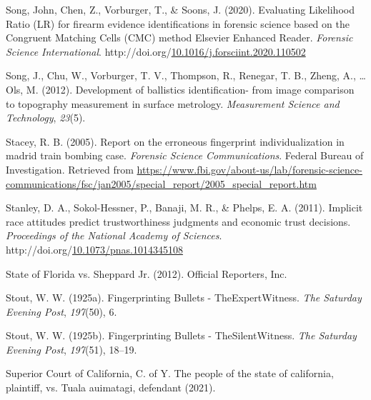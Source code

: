 \documentclass[print]{nuthesis}
\newlength{\cslhangindent}
\newenvironment{CSLReferences}[2]%
{\setlength{\parindent}{0pt}%
\everypar{\setlength{\hangindent}{\cslhangindent}}\ignorespaces}%
{\par}
\begin{document}
\begin{CSLReferences}{1}{0}
\leavevmode{}%
Song, John, Chen, Z., Vorburger, T., \& Soons, J. (2020). Evaluating {Likelihood} {Ratio} ({LR}) for firearm evidence identifications in forensic science based on the {Congruent} {Matching} {Cells} ({CMC}) method {\textbar} {Elsevier} {Enhanced} {Reader}. \emph{Forensic Science International}. http://doi.org/\href{https://doi.org/10.1016/j.forsciint.2020.110502}{10.1016/j.forsciint.2020.110502}

\leavevmode{}%
Song, J., Chu, W., Vorburger, T. V., Thompson, R., Renegar, T. B., Zheng, A., \ldots{} Ols, M. (2012). Development of ballistics identification- from image comparison to topography measurement in surface metrology. \emph{Measurement Science and Technology}, \emph{23}(5).

\leavevmode{}%
Stacey, R. B. (2005). Report on the erroneous fingerprint individualization in madrid train bombing case. \emph{Forensic Science Communications}. {Federal Bureau of Investigation}. Retrieved from \url{https://www.fbi.gov/about-us/lab/forensic-science-communications/fsc/jan2005/special_report/2005_special_report.htm}

\leavevmode{}%
Stanley, D. A., Sokol-Hessner, P., Banaji, M. R., \& Phelps, E. A. (2011). Implicit race attitudes predict trustworthiness judgments and economic trust decisions. \emph{Proceedings of the National Academy of Sciences}. http://doi.org/\href{https://doi.org/10.1073/pnas.1014345108}{10.1073/pnas.1014345108}

\leavevmode{}%
State of {Florida} vs. Sheppard {Jr.} (2012). Official Reporters, Inc.

\leavevmode{}%
Stout, W. W. (1925a). {Fingerprinting} {Bullets} - {The}{Expert}{Witness}. \emph{The {Saturday} {Evening} {Post}}, \emph{197}(50), 6.

\leavevmode{}%
Stout, W. W. (1925b). {Fingerprinting} {Bullets} - {The}{Silent}{Witness}. \emph{The {Saturday} {Evening} {Post}}, \emph{197}(51), 18--19.

\leavevmode{}%
Superior Court of California, C. of Y. The people of the state of california, plaintiff, vs. Tuala auimatagi, defendant (2021).


\end{CSLReferences}
\end{document}
